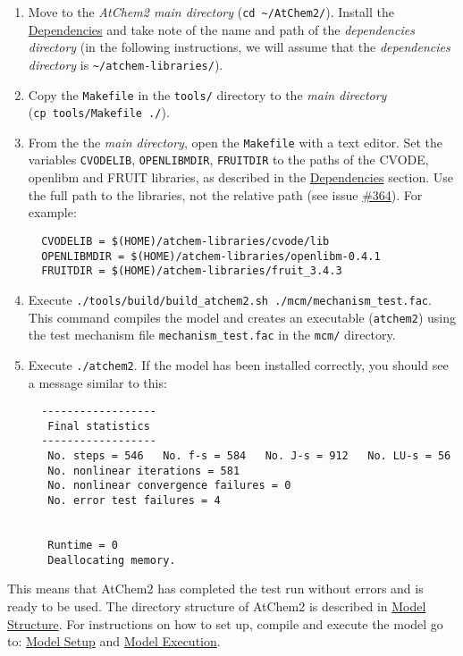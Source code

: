 \begin{enumerate}
\item Move to the \emph{AtChem2 main directory} (\texttt{cd\
    \textasciitilde{}/AtChem2/}). Install the
  \hyperref[sec:dependencies]{Dependencies} and take note of the name
  and path of the \emph{dependencies directory} (in the following
  instructions, we will assume that the \emph{dependencies directory}
  is \texttt{\textasciitilde{}/atchem-libraries/}).
\item Copy the \texttt{Makefile} in the \texttt{tools/} directory to
  the \emph{main directory} (\texttt{cp\ tools/Makefile\ ./}).
\item From the the \emph{main directory}, open the \texttt{Makefile}
  with a text editor. Set the variables \texttt{CVODELIB},
  \texttt{OPENLIBMDIR}, \texttt{FRUITDIR} to the paths of the CVODE,
  openlibm and FRUIT libraries, as described in the
  \hyperref[sec:dependencies]{Dependencies} section. Use the full path
  to the libraries, not the relative path (see issue
  \href{https://github.com/AtChem/AtChem2/issues/364}{\#364}). For
  example:
  \begin{verbatim}
  CVODELIB = $(HOME)/atchem-libraries/cvode/lib
  OPENLIBMDIR = $(HOME)/atchem-libraries/openlibm-0.4.1
  FRUITDIR = $(HOME)/atchem-libraries/fruit_3.4.3
  \end{verbatim}
\item Execute \texttt{./tools/build/build\_atchem2.sh\
    ./mcm/mechanism\_test.fac}. This command compiles the model and
  creates an executable (\texttt{atchem2}) using the test mechanism
  file \texttt{mechanism\_test.fac} in the \texttt{mcm/} directory.
\item Execute \texttt{./atchem2}. If the model has been installed
  correctly, you should see a message similar to this:
  \begin{verbatim}
  ------------------
   Final statistics
  ------------------
   No. steps = 546   No. f-s = 584   No. J-s = 912   No. LU-s = 56
   No. nonlinear iterations = 581
   No. nonlinear convergence failures = 0
   No. error test failures = 4


   Runtime = 0
   Deallocating memory.
  \end{verbatim}
\end{enumerate}

This means that AtChem2 has completed the test run without errors and
is ready to be used. The directory structure of AtChem2 is described
in \hyperref[sec:structure]{Model Structure}. For instructions on how
to set up, compile and execute the model go to:
\hyperref[ch:setup]{Model Setup} and \hyperref[ch:execution]{Model
  Execution}.

